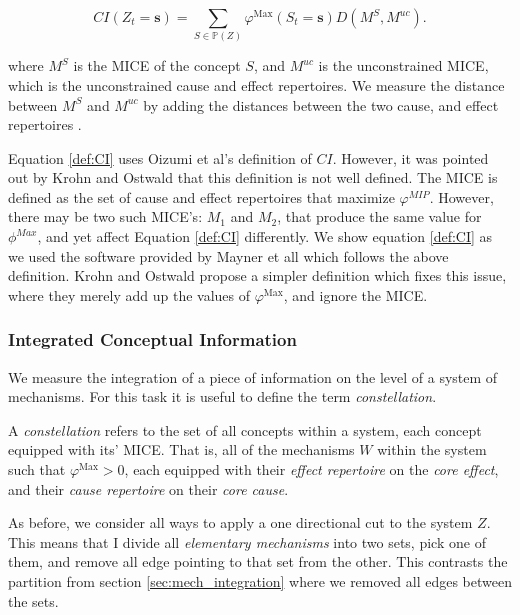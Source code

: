 \begin{equation}
\label{def:CI}
CI(Z_t = \mathbf{s}) = \sum \limits_{S \in \mathbb{P}(Z)} \varphi^{\text{Max}}(S_t=\mathbf{s}) D(M^S, M^{uc}).
\end{equation}

where $M^S$ is the MICE of the concept $S$, and $M^{uc}$ is the unconstrained MICE, which is the unconstrained cause and effect repertoires. We measure the distance between $M^S$ and $M^{uc}$ by adding the distances between the two cause, and effect repertoires \cite{oizumi2014phenomenology}.

\begin{remark}
	Equation \ref{def:CI} uses Oizumi et al's \cite{oizumi2014phenomenology} definition of $CI$. However, it was pointed out by Krohn and Ostwald \cite{krohn2016computing} that this definition is not well defined. The MICE is defined as the set of cause and effect repertoires that maximize $\varphi^{MIP}$. However, there may be two such MICE's: $M_1$ and $M_2$, that produce the same value for $\phi^{Max}$, and yet affect Equation \ref{def:CI} differently. We show equation \ref{def:CI} as we used the software provided by Mayner et all \cite{pyphi} which follows the above definition. Krohn and Ostwald propose a simpler definition which fixes this issue, where they merely add up the values of $\varphi^{\text{Max}}$, and ignore the MICE.
\end{remark}

\subsubsection{Integrated Conceptual Information}
We measure the integration of a piece of information on the level of a system of mechanisms. For this task it is useful to define the term \textit{constellation}.

\begin{definition}
	A \textit{constellation} refers to the set of all concepts within a system, each concept equipped with its' MICE. That is, all of the mechanisms $W$ within the system such that $\varphi^{\text{Max}}>0$, each equipped with their \textit{effect repertoire} on the \textit{core effect}, and their \textit{cause repertoire} on their \textit{core cause}.
\end{definition}

As before, we consider all ways to apply a one directional cut to the system $Z$. This means that I divide all \textit{elementary mechanisms} into two sets, pick one of them, and remove all edge pointing to that set from the other. This contrasts the partition from section \ref{sec:mech_integration} where we removed all edges between the sets.

